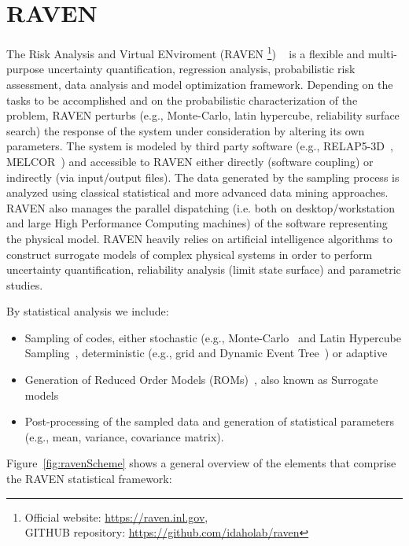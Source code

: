 \section{RAVEN}
\label{sec:raven}
 
The Risk Analysis and Virtual ENviroment 
(RAVEN
\footnote{Official website: \url{https://raven.inl.gov},\\ 
GITHUB repository: \url{https://github.com/idaholab/raven}})
~\cite{RAVEN_PSAM_2014,alfonsiEsrel2014} 
is a flexible and multi-purpose uncertainty quantification, regression analysis, probabilistic
risk assessment, data analysis and model optimization framework. Depending on the tasks to be 
accomplished and on the probabilistic characterization of the problem, RAVEN perturbs 
(e.g., Monte-Carlo, latin hypercube, reliability surface search) the response of the system 
under consideration by altering its own parameters. The system is modeled by third party software 
(e.g., RELAP5-3D~\cite{relap5}, MELCOR~\cite{Melcor}) and accessible to RAVEN either directly (software coupling) 
or indirectly (via input/output files). The data generated by the sampling process is analyzed using 
classical statistical and more advanced data mining approaches. RAVEN also manages the parallel dispatching 
(i.e. both on desktop/workstation and large High Performance Computing machines) of the software 
representing the physical model. RAVEN heavily relies on artificial intelligence algorithms to construct 
surrogate models of complex physical systems in order to perform uncertainty quantification, reliability 
analysis (limit state surface) and parametric studies.

By statistical analysis we include:
\begin{itemize}
  \item Sampling of codes, either stochastic (e.g., Monte-Carlo~\cite{DynamicReliabilityMonteCarlo} 
        and Latin Hypercube Sampling~\cite{LHShelton}, deterministic (e.g., grid and
        Dynamic Event Tree~\cite{AMENDOLAdylam,cojazziDylam}) or adaptive~\cite{ANS_S_2014_raven_LS}
  \item Generation of Reduced Order Models (ROMs)~\cite{ROM_Khalik}, also known as Surrogate models
  \item Post-processing of the sampled data and generation of statistical parameters (e.g., mean, 
        variance, covariance matrix).
\end{itemize}

Figure~\ref{fig:ravenScheme} shows a general overview of the elements that comprise the RAVEN statistical framework:

